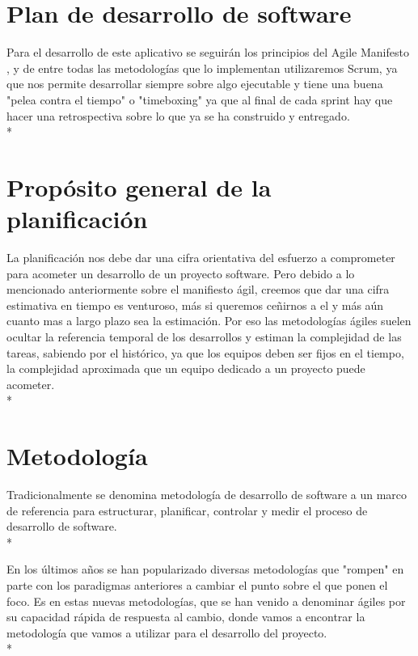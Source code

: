 \documentclass[../pfc.tex]{subfiles}
\begin{document}
	
	\section{Plan de desarrollo de software}
	
	Para el desarrollo de este aplicativo se seguirán los principios del Agile Manifesto \cite{agile}, y de entre todas las metodologías que lo implementan utilizaremos Scrum, ya que nos permite desarrollar siempre sobre algo ejecutable y tiene una buena "pelea contra el tiempo" o "timeboxing" ya que al final de cada sprint hay que hacer una retrospectiva sobre lo que ya se ha construido y entregado.\\*

	\section{Propósito general de la planificación}
	
	La planificación nos debe dar una cifra orientativa del esfuerzo a comprometer para acometer un desarrollo de un proyecto software. Pero debido a lo mencionado anteriormente sobre el manifiesto ágil, creemos que dar una cifra estimativa en tiempo es venturoso, más si queremos ceñirnos a el y más aún cuanto mas a largo plazo sea la estimación. Por eso las metodologías ágiles suelen ocultar la referencia temporal de los desarrollos y estiman la complejidad de las tareas, sabiendo por el histórico, ya que los equipos deben ser fijos en el tiempo, la complejidad aproximada que un equipo dedicado a un proyecto puede acometer.\\*
	
	\section{Metodología }
	
	Tradicionalmente se denomina metodología de desarrollo de software a un marco de referencia para estructurar, planificar, controlar y medir el proceso de desarrollo de software.\cite{wiki-metodologia}\\*
	
	En los últimos años se han popularizado diversas metodologías que "rompen" en parte con los paradigmas anteriores a cambiar el punto sobre el que ponen el foco. Es en estas nuevas metodologías, que se han venido a denominar ágiles por su capacidad rápida de respuesta al cambio, donde vamos a encontrar la metodología que vamos a utilizar para el desarrollo del proyecto.\\*
	
\end{document}

